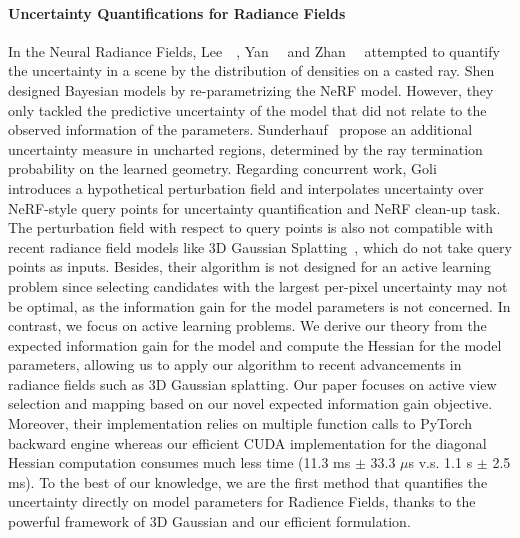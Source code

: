 \paragraph{Uncertainty Quantifications for Radiance Fields}
In the Neural Radiance Fields, Lee~\etal~\cite{lee2022uncertainty}, Yan~\etal~\cite{yan2023activeIO} and Zhan~\etal~\cite{zhan2022activermap} attempted to quantify the uncertainty in a scene by the distribution of densities on a casted ray. Shen~\etal~\cite{CF-NeRF,shen2021snerf} designed Bayesian models by re-parametrizing the NeRF model. However, they only tackled the predictive uncertainty of the model that did not relate to the observed information of the parameters. 
Sunderhauf~\etal\cite{sünderhauf2022densityaware} propose an additional uncertainty measure in uncharted regions, determined by the ray termination probability on the learned geometry.
Regarding concurrent work, Goli~\etal~\cite{goli2023} introduces a hypothetical perturbation field and interpolates uncertainty over NeRF-style query points for uncertainty quantification and NeRF clean-up task.
The perturbation field with respect to query points is also not compatible with recent radiance field models like 3D Gaussian Splatting~\cite{kerbl3Dgaussians}, which do not take query points as inputs.
Besides, their algorithm is not designed for an active learning problem since selecting candidates with the largest per-pixel uncertainty may not be optimal, as the information gain for the model parameters is not concerned.
In contrast, we focus on active learning problems. We derive our theory from the expected information gain for the model and compute the Hessian for the model parameters, allowing us to apply our algorithm to recent advancements in radiance fields such as 3D Gaussian splatting. 
Our paper focuses on active view selection and mapping based on our novel expected information gain objective. 
Moreover, their implementation relies on multiple function calls to PyTorch backward engine whereas our efficient CUDA implementation for the diagonal Hessian computation consumes much less time (11.3 ms $\pm$ 33.3 $\mu$s v.s. 1.1 s $\pm$ 2.5 ms).
To the best of our knowledge, we are the first method that quantifies the uncertainty directly on model parameters for Radience Fields, thanks to the powerful framework of 3D Gaussian and our efficient formulation. 
